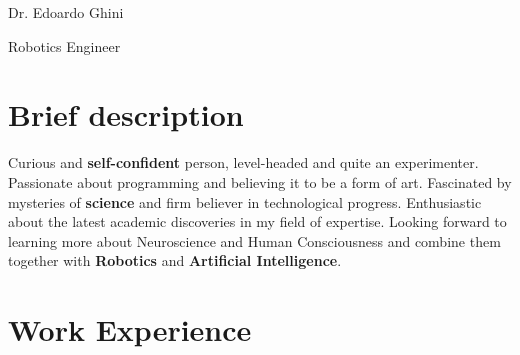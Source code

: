 \documentclass[
	10pt, %
]{../templates/FreemanCV}
\begin{document}
\begin{paracol}{2} %


\parbox[][0.09\textheight][c]{\linewidth}{ %
	\centering %
	
	{\sffamily\Huge Dr. Edoardo Ghini} %
	
	\medskip %
	
	{\Huge\textcolor{headings}{Robotics Engineer}}
	
	\vfill %
}

\section{Brief description}

  Curious and \textbf{self-confident} person, level-headed and quite an experimenter.
Passionate about programming and believing it to be a form of art.
  Fascinated by mysteries of \textbf{science} and firm believer in technological progress.
Enthusiastic about the latest academic discoveries in my field of expertise.
  Looking forward to learning more about Neuroscience and Human Consciousness and combine them together with \textbf{Robotics} and \textbf{Artificial Intelligence}.



\section{Work Experience}




\end{paracol}
\end{document}
